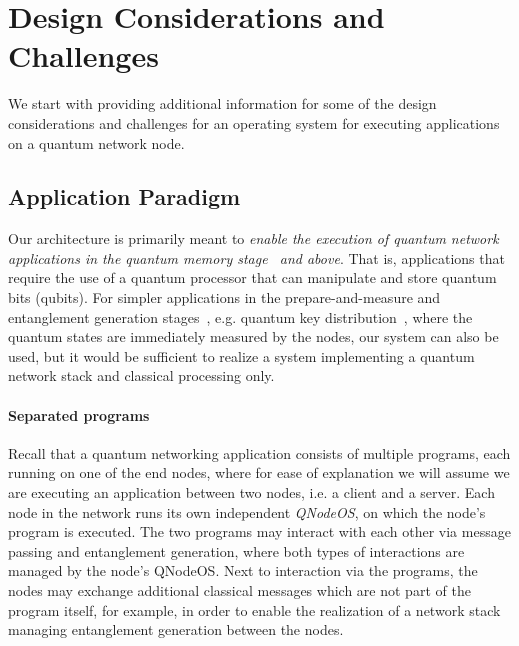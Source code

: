 \section{Design Considerations and Challenges}
\label{qnodeos:sec:design-consid:challenges}

We start with providing additional information for some of the design considerations and challenges for an operating system for executing applications on a quantum network node.

\subsection{Application Paradigm}
\label{qnodeos:sec:design-consid:challenges:application}

Our architecture is primarily meant to \emph{enable the execution of quantum network applications in the quantum memory stage~\cite{wehner_2018_stages} and above}. That is, applications that require the use of a quantum processor that can manipulate and store quantum bits (qubits). For simpler applications in the prepare-and-measure and entanglement generation stages~\cite{wehner_2018_stages}, e.g. quantum key distribution~\cite{bb84Original,ekert_1991_e91}, where the quantum states are immediately measured by the nodes, our system can also be used, but it would be sufficient to realize a system implementing a quantum network stack and classical processing only.

\paragraph{Separated programs}

Recall that a quantum networking application consists of multiple programs, each running on one of the end nodes, where for ease of explanation we will assume we are executing an application between two nodes, i.e. a client and a server. Each node in the network runs its own independent \emph{\ac{QNodeOS}}, on which the node's program is executed. The two programs may interact with each other via message passing and entanglement generation, where both types of interactions are managed by the node's \ac{QNodeOS}. Next to interaction via the programs, the nodes may exchange additional classical messages which are not part of the program itself, for example, in order to enable the realization of a network stack~\cite{dahlberg_2019_egp} managing entanglement generation between the nodes.

